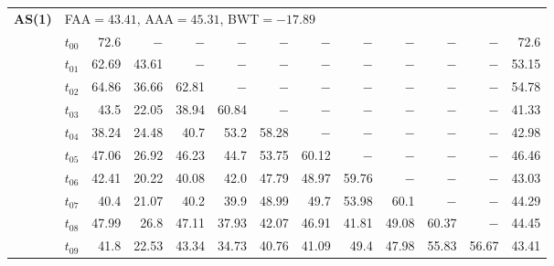 \begin{table}[ht]
\begin{tabular}{@{}l l r r r r r r r r r r r@{}}
\midrule
\multirow{11}{*}{\textbf{AS(1)}} & \multicolumn{12}{l}{\quad\small FAA$=43.41$,\; AAA$=45.31$,\; BWT$=-17.89$} \\
 & $t_{00}$ & 72.6 & $-$ & $-$ & $-$ & $-$ & $-$ & $-$ & $-$ & $-$ & $-$ & 72.6 \\
 & $t_{01}$ & 62.69 & 43.61 & $-$ & $-$ & $-$ & $-$ & $-$ & $-$ & $-$ & $-$ & 53.15 \\
 & $t_{02}$ & 64.86 & 36.66 & 62.81 & $-$ & $-$ & $-$ & $-$ & $-$ & $-$ & $-$ & 54.78 \\
 & $t_{03}$ & 43.5 & 22.05 & 38.94 & 60.84 & $-$ & $-$ & $-$ & $-$ & $-$ & $-$ & 41.33 \\
 & $t_{04}$ & 38.24 & 24.48 & 40.7 & 53.2 & 58.28 & $-$ & $-$ & $-$ & $-$ & $-$ & 42.98 \\
 & $t_{05}$ & 47.06 & 26.92 & 46.23 & 44.7 & 53.75 & 60.12 & $-$ & $-$ & $-$ & $-$ & 46.46 \\
 & $t_{06}$ & 42.41 & 20.22 & 40.08 & 42.0 & 47.79 & 48.97 & 59.76 & $-$ & $-$ & $-$ & 43.03 \\
 & $t_{07}$ & 40.4 & 21.07 & 40.2 & 39.9 & 48.99 & 49.7 & 53.98 & 60.1 & $-$ & $-$ & 44.29 \\
 & $t_{08}$ & 47.99 & 26.8 & 47.11 & 37.93 & 42.07 & 46.91 & 41.81 & 49.08 & 60.37 & $-$ & 44.45 \\
 & $t_{09}$ & 41.8 & 22.53 & 43.34 & 34.73 & 40.76 & 41.09 & 49.4 & 47.98 & 55.83 & 56.67 & 43.41 \\
\bottomrule
\end{tabular}
\end{table}


